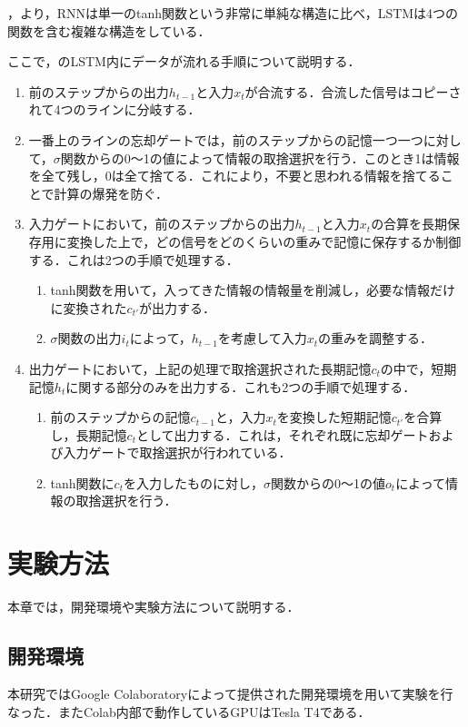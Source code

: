 \documentclass{eithesis}
\begin{document}
    ，より，RNNは単一のtanh関数という非常に単純な構造に比べ，LSTMは4つの関数を含む複雑な構造をしている．

    ここで，のLSTM内にデータが流れる手順について説明する．
    \begin{enumerate}
      \item 前のステップからの出力$h_{t-1}$と入力$x_t$が合流する．合流した信号はコピーされて4つのラインに分岐する．
      \item 一番上のラインの忘却ゲートでは，前のステップからの記憶一つ一つに対して，$\sigma$関数からの0〜1の値によって情報の取捨選択を行う．このとき1は情報を全て残し，0は全て捨てる．これにより，不要と思われる情報を捨てることで計算の爆発を防ぐ．
      \item 入力ゲートにおいて，前のステップからの出力$h_{t-1}$と入力$x_t$の合算を長期保存用に変換した上で，どの信号をどのくらいの重みで記憶に保存するか制御する．これは2つの手順で処理する．
        \begin{enumerate}
          \item tanh関数を用いて，入ってきた情報の情報量を削減し，必要な情報だけに変換された$c_{t'}$が出力する．
          \item $\sigma$関数の出力$i_t$によって，$h_{t-1}$を考慮して入力$x_t$の重みを調整する．
        \end{enumerate}
      \item 出力ゲートにおいて，上記の処理で取捨選択された長期記憶$c_t$の中で，短期記憶$h_t$に関する部分のみを出力する．これも2つの手順で処理する．
        \begin{enumerate}
          \item 前のステップからの記憶$c_{t-1}$と，入力$x_t$を変換した短期記憶$c_{t'}$を合算し，長期記憶$c_t$として出力する．これは，それぞれ既に忘却ゲートおよび入力ゲートで取捨選択が行われている．
          \item tanh関数に$c_t$を入力したものに対し，$\sigma$関数からの0〜1の値$o_t$によって情報の取捨選択を行う．
        \end{enumerate}
    \end{enumerate}

\chapter{実験方法}
  本章では，開発環境や実験方法について説明する．

  \section{開発環境}
    本研究ではGoogle Colaboratoryによって提供された開発環境を用いて実験を行なった．またColab内部で動作しているGPUはTesla T4である．
\end{document}
